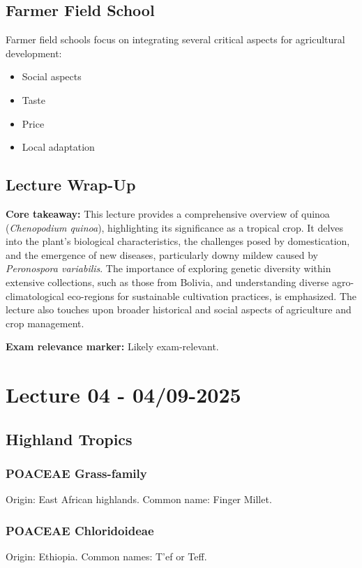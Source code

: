 \subsection{Farmer Field School} 
Farmer field schools focus on integrating several critical aspects for agricultural development: 
\begin{itemize} 
    \item Social aspects 
    \item Taste 
    \item Price 
    \item Local adaptation 
\end{itemize}


\subsection*{Lecture Wrap-Up} \textbf{Core takeaway:} 
This lecture provides a comprehensive overview of quinoa (\textit{Chenopodium quinoa}), highlighting its significance as a tropical crop. It delves into the plant's biological characteristics, the challenges posed by domestication, and the emergence of new diseases, particularly downy mildew caused by \textit{Peronospora variabilis}. The importance of exploring genetic diversity within extensive collections, such as those from Bolivia, and understanding diverse agro-climatological eco-regions for sustainable cultivation practices, is emphasized. The lecture also touches upon broader historical and social aspects of agriculture and crop management. 

\vspace{1em} 
\textbf{Exam relevance marker:} Likely exam-relevant.

\section{Lecture 04 - 04/09-2025}

\subsection{Highland Tropics} 
\subsubsection{POACEAE Grass-family} 
Origin: East African highlands. Common name: Finger Millet.

\subsubsection{POACEAE Chloridoideae} 
Origin: Ethiopia. Common names: T'ef or Teff.

